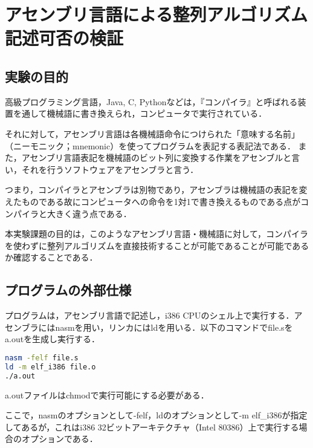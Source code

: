 \section{アセンブリ言語による整列アルゴリズム記述可否の検証}
\subsection{実験の目的}
高級プログラミング言語，{\ttfamily Java, C, Python}などは，『コンパイラ』と呼ばれる装置を通して機械語に書き換えられ，コンピュータで実行されている．\par
それに対して，アセンブリ言語は各機械語命令につけられた「意味する名前」（ニーモニック；mnemonic）を使ってプログラムを表記する表記法である．
また，アセンブリ言語表記を機械語のビット列に変換する作業をアセンブルと言い，それを行うソフトウェアをアセンブラと言う．\cite{assembly}\par
つまり，コンパイラとアセンブラは別物であり，アセンブラは機械語の表記を変えたものである故にコンピュータへの命令を1対1で書き換えるものである点がコンパイラと大きく違う点である．\par
本実験課題の目的は，このようなアセンブリ言語・機械語に対して，コンパイラを使わずに整列アルゴリズムを直接技術することが可能であることが可能であるか確認することである．
\subsection{プログラムの外部仕様}
プログラムは，アセンブリ言語で記述し，i386 CPUのシェル上で実行する．アセンブラには{\ttfamily nasm}を用い，リンカには{\ttfamily ld}を用いる．以下のコマンドで{\ttfamily file.s}を{\ttfamily a.out}を生成し実行する．
\begin{lstlisting}[language={Bash},numbers = {none},frame = {single}]
nasm -felf file.s
ld -m elf_i386 file.o
./a.out
    \end{lstlisting}
{\ttfamily a.out}ファイルは{\ttfamily chmod}で実行可能にする必要がある．\par
ここで，{\ttfamily nasm}のオプションとして{\ttfamily -felf}，{\ttfamily ld}のオプションとして{\ttfamily -m elf\_i386}が指定してあるが，これはi386 32ビットアーキテクチャ（Intel 80386）上で実行する場合のオプションである．
